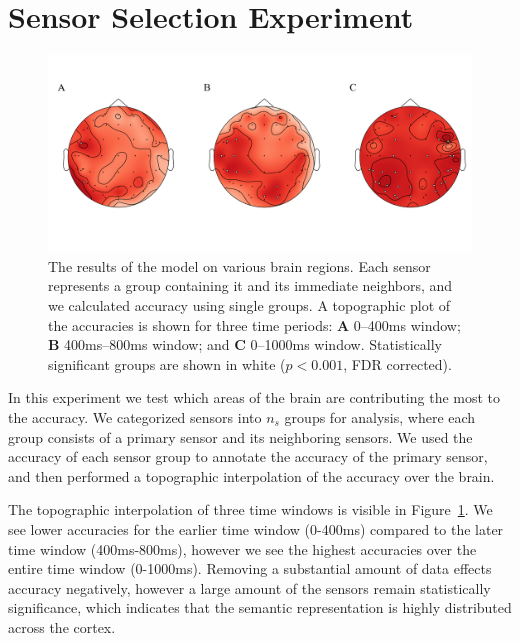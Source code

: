 \section{Sensor Selection Experiment}

\begin{figure}[t]
  \centering
  \includegraphics[width=0.9\linewidth]{figures/topographic}
  \caption{
    The results of the model on various brain regions. Each sensor represents a 
    group containing it and its immediate neighbors, and we calculated \tvt 
    accuracy using single groups.  A topographic plot of the \tvt accuracies is 
    shown for three time periods: {\bf A}  0--400ms window; {\bf B} 
    400ms--800ms window; and {\bf C} 0--1000ms window. Statistically 
    significant groups are shown in white ($p < 0.001$, FDR corrected).
  }
  \label{fig:topographic}
\end{figure}


In this experiment we test which areas of the brain are contributing the most 
to the \tvt accuracy. We categorized sensors into $n_s$ groups for analysis, 
where each group consists of a primary sensor and its neighboring sensors. We 
used the accuracy of each sensor group to annotate the accuracy of the primary 
sensor, and then performed a topographic interpolation of the \tvt accuracy 
over the brain. 

The topographic interpolation of three time windows is visible in 
Figure~\ref{fig:topographic}. We see lower \tvt accuracies for the earlier time 
window (0-400ms) compared to the later time window (400ms-800ms), however we 
see the highest accuracies over the entire time window (0-1000ms). Removing a 
substantial amount of data effects accuracy negatively, however a large amount 
of the sensors remain statistically significance, which indicates that the 
semantic representation is highly distributed across the cortex.
